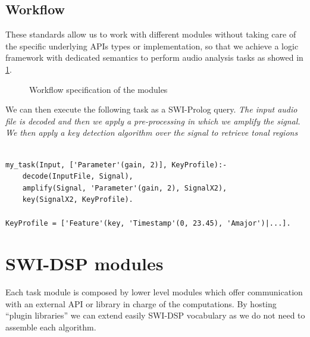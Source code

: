 \documentclass[runningheads]{llncs}
\begin{document}
\subsection{Workflow}\label{subsec:worflow}

These standards allow us to work with different modules without taking care of the specific underlying APIs types or implementation, so that we achieve a logic framework with dedicated semantics to perform audio analysis tasks as showed in \ref{fig:workflow}.

\begin{figure}
\centerline{}
\caption{Workflow specification of the modules}
\label{fig:workflow}
\end{figure}

We can then execute the following task as a SWI-Prolog query. \textit{The input audio file is decoded and then we apply a pre-processing in which we amplify the signal. We then apply a key detection algorithm over the signal to retrieve tonal regions}

\begin{verbatim}
 
my_task(Input, ['Parameter'(gain, 2)], KeyProfile):-
	decode(InputFile, Signal),
	amplify(Signal, 'Parameter'(gain, 2), SignalX2),
	key(SignalX2, KeyProfile).

KeyProfile = ['Feature'(key, 'Timestamp'(0, 23.45), 'Amajor')|...].	

\end{verbatim}

\section{SWI-DSP modules}\label{sec:modules}

Each task module is composed by lower level modules which offer communication with an external API or library in charge of the computations. By hosting ``plugin libraries'' we can extend easily SWI-DSP vocabulary as we do not need to assemble each algorithm.
\end{document}
